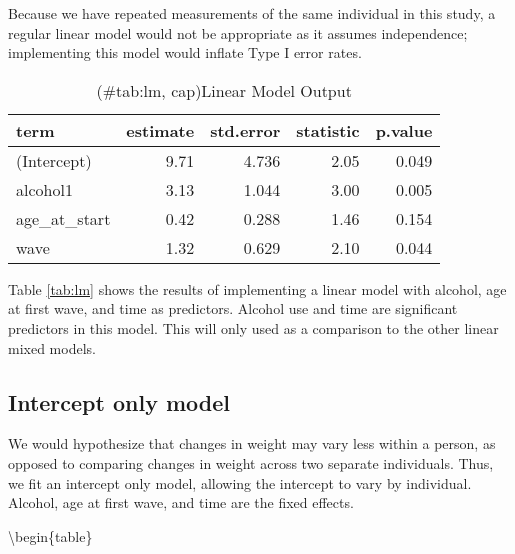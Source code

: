\documentclass[12pt, twoside]{amherstthesis}
\begin{document}
Because we have repeated measurements of the same individual in this study, a regular linear model would not be appropriate as it assumes independence; implementing this model would inflate Type I error rates.
\begin{table}

\caption{(\#tab:lm, cap)Linear Model Output}
\centering
\begin{tabular}[t]{l|r|r|r|r}
\hline
term & estimate & std.error & statistic & p.value\\
\hline
(Intercept) & 9.71 & 4.736 & 2.05 & 0.049\\
\hline
alcohol1 & 3.13 & 1.044 & 3.00 & 0.005\\
\hline
age\_at\_start & 0.42 & 0.288 & 1.46 & 0.154\\
\hline
wave & 1.32 & 0.629 & 2.10 & 0.044\\
\hline
\end{tabular}
\end{table}
Table \ref{tab:lm} shows the results of implementing a linear model with alcohol, age at first wave, and time as predictors. Alcohol use and time are significant predictors in this model. This will only used as a comparison to the other linear mixed models.

\hypertarget{intercept-only-model}{%
\subsection{Intercept only model}\label{intercept-only-model}}

We would hypothesize that changes in weight may vary less within a person, as opposed to comparing changes in weight across two separate individuals. Thus, we fit an intercept only model, allowing the intercept to vary by individual. Alcohol, age at first wave, and time are the fixed effects.

\textbackslash begin\{table\}
\end{document}
